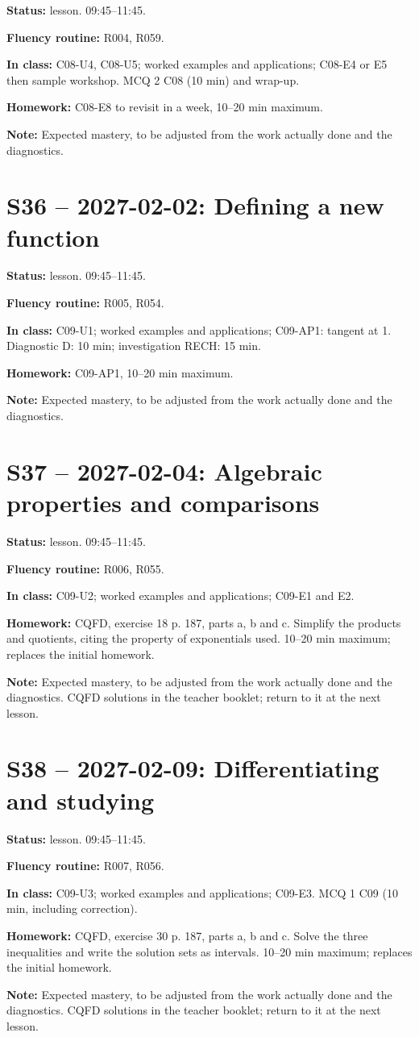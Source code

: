 \textbf{Status:} lesson. 09:45–11:45.\par\textbf{Fluency routine:} R004, R059.\par\textbf{In class:} C08-U4, C08-U5; worked examples and applications; C08-E4 or E5 then sample workshop.  MCQ 2 C08 (10 min) and wrap-up.\par\textbf{Homework:} C08-E8 to revisit in a week, 10–20 min maximum.\par\textbf{Note:} Expected mastery, to be adjusted from the work actually done and the diagnostics.
\section*{S36 -- 2027-02-02: Defining a new function}
\textbf{Status:} lesson. 09:45–11:45.\par\textbf{Fluency routine:} R005, R054.\par\textbf{In class:} C09-U1; worked examples and applications; C09-AP1: tangent at 1. Diagnostic D: 10 min; investigation RECH: 15 min.\par\textbf{Homework:} C09-AP1, 10–20 min maximum.\par\textbf{Note:} Expected mastery, to be adjusted from the work actually done and the diagnostics.
\section*{S37 -- 2027-02-04: Algebraic properties and comparisons}
\textbf{Status:} lesson. 09:45–11:45.\par\textbf{Fluency routine:} R006, R055.\par\textbf{In class:} C09-U2; worked examples and applications; C09-E1 and E2. \par\textbf{Homework:} CQFD, exercise 18 p. 187, parts a, b and c. Simplify the products and quotients, citing the property of exponentials used. 10–20 min maximum; replaces the initial homework.\par\textbf{Note:} Expected mastery, to be adjusted from the work actually done and the diagnostics. CQFD solutions in the teacher booklet; return to it at the next lesson.
\section*{S38 -- 2027-02-09: Differentiating and studying}
\textbf{Status:} lesson. 09:45–11:45.\par\textbf{Fluency routine:} R007, R056.\par\textbf{In class:} C09-U3; worked examples and applications; C09-E3.  MCQ 1 C09 (10 min, including correction).\par\textbf{Homework:} CQFD, exercise 30 p. 187, parts a, b and c. Solve the three inequalities and write the solution sets as intervals. 10–20 min maximum; replaces the initial homework.\par\textbf{Note:} Expected mastery, to be adjusted from the work actually done and the diagnostics. CQFD solutions in the teacher booklet; return to it at the next lesson.
